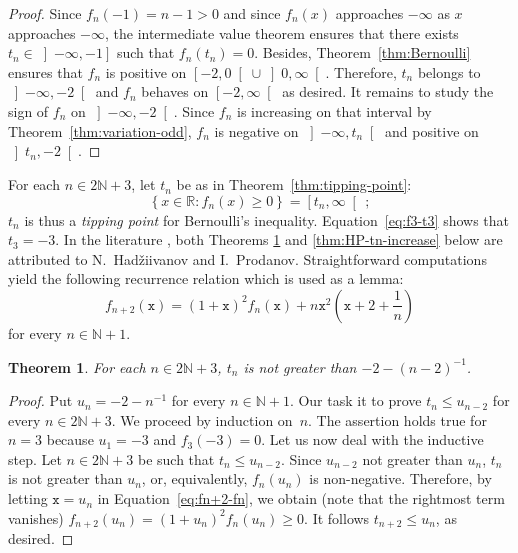 \documentclass[12pt]{article}
\newcommand{\bR}{\mathbb{R}}
\newcommand{\bN}{\mathbb{N}}
\newcommand{\gtint}[1]{\left] #1, \infty \right[}
\newcommand{\geint}[1]{\left[ #1, \infty \right[}
\newcommand{\ltint}[1]{\left]- \infty, #1 \right[}
\newcommand{\leint}[1]{\left]- \infty, #1 \right]}
\newcommand{\ttx}{\mathtt{x}}
\newtheorem{theorem}{Theorem}
\begin{document}
 \begin{proof}
   Since $f_n(- 1) = n - 1 > 0$ and since $f_n(x)$ approaches $- \infty$ as $x$ approaches $- \infty$,
   the intermediate value theorem ensures that there exists $t_n \in \leint{- 1}$ such that $f_n(t_n) = 0$.
   Besides, Theorem~\ref{thm:Bernoulli} ensures that $f_n$ is positive on $\left[-2, 0 \right[ \cup \gtint{0}$.
   Therefore, $t_n$ belongs to $\ltint{- 2}$ and
   $f_n$ behaves on $\geint{- 2}$ as desired.
   It remains to study the sign of $f_n$ on $\ltint{-2}$.
   Since $f_n$ is increasing on that interval by Theorem~\ref{thm:variation-odd},
   $f_n$ is negative on $\ltint{t_n}$ and
   positive on $\left]t_n, - 2 \right[$.
 \end{proof}

 For each $n \in 2 \bN + 3$,
 let $t_n$ be as in Theorem~\ref{thm:tipping-point}:
 $$
 \left\{ x \in \bR : f_n(x) \ge 0 \right\}
 =
 \geint{t_n} \,; 
 $$
$t_n$ is thus a \emph{tipping point} for Bernoulli's inequality.
 Equation~\eqref{eq:f3-t3} shows that $t_3 = - 3$. 
 In the literature \cite{MitrinovicCNIA, MitrinovicAI, MitrinovicP93, MondP94},
 both Theorems \ref{thm:HP-upper} and \ref{thm:HP-tn-increase} below are attributed to N.~Had\v{z}iivanov and I.~Prodanov.
Straightforward computations yield the following recurrence relation which is used as a lemma:
 \begin{equation} \label{eq:fn+2-fn}
   f_{n + 2} (\ttx) = {(1 + \ttx)}^2 f_n(\ttx) + n \ttx^2 \left(\ttx + 2 + \frac{1}{n} \right)
 \end{equation}
 for every $n \in \bN + 1$.
 
 \begin{theorem} \label{thm:HP-upper}
   For each $n \in 2 \bN + 3$, $t_n$ is not greater than $- 2 - {(n - 2)}^{-1}$.
 \end{theorem}

 \begin{proof}
   Put $u_n = - 2 - n^{-1}$ for every $n \in \bN + 1$.
   Our task it to prove $t_n \le u_{n - 2}$ for every $n \in 2 \bN + 3$.
   We proceed by induction on~$n$.
   The assertion holds true for $n = 3$ because $u_1 = - 3$ and $f_3(- 3) = 0$.
   Let us now deal with the inductive step.
   Let $n \in 2 \bN + 3$ be such that $t_n \le u_{n - 2}$.
   Since $u_{n - 2}$ not greater than $u_n$, $t_n$ is not greater than $u_n$, or, equivalently, $f_n(u_n)$ is non-negative.
   Therefore,  
   by letting $\ttx = u_n$ in Equation~\eqref{eq:fn+2-fn}, we obtain (note that the rightmost term vanishes)
   $f_{n + 2}(u_n) = {( 1 + u_n )}^2 f_n(u_n) \ge 0$.
   It follows $t_{n + 2} \le u_n$, as desired.
 \end{proof}
 
\end{document}
